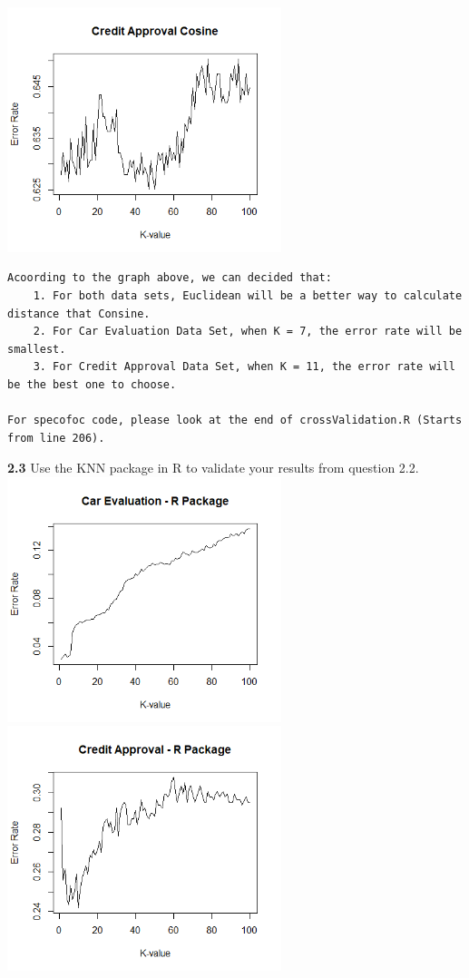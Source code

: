 \documentclass{article}
\begin{document}
\includegraphics[width=8cm]{CreditApprovalCosine.PNG}
\begin{verbatim}
Acoording to the graph above, we can decided that:
	1. For both data sets, Euclidean will be a better way to calculate distance that Consine.
	2. For Car Evaluation Data Set, when K = 7, the error rate will be smallest.
	3. For Credit Approval Data Set, when K = 11, the error rate will be the best one to choose.

For specofoc code, please look at the end of crossValidation.R (Starts from line 206).
\end{verbatim}
\pagebreak
\textbf{2.3} Use the KNN package in R  to validate your results from question 2.2.
\\
\includegraphics[width=8cm]{CarEvaluation_R.PNG}
\includegraphics[width=8cm]{CreditApproval_R.PNG}
\end{document}
